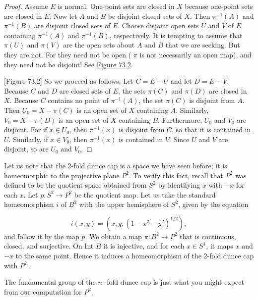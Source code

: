 \begin{proof}
Assume \(E\) is normal. One-point sets are closed in \(X\) because one-point sets are closed in \(E\). Now let \(A\) and \(B\) be disjoint closed sets of \(X\). Then \({\pi }^{-1}( A)\) and \({\pi }^{-1}( B)\) are disjoint closed sets of \(E\). Choose disjoint open sets \(U\) and \(V\) of \(E\) containing \({\pi }^{-1}( A)\) and \({\pi }^{-1}( B)\), respectively. It is tempting to assume that \(\pi ( U)\) and \(\pi ( V)\) are the open sets about \(A\) and \(B\) that we are seeking. But they are not. For they need not be open ( \(\pi\) is not necessarily an open map), and they need not be disjoint! See \hyperref[fig:73.2]{Figure 73.2}.

[Figure 73.2]
So we proceed as follows: Let \(C = E - U\) and let \(D = E - V\). Because \(C\) and \(D\) are closed sets of \(E\), the sets \(\pi ( C)\) and \(\pi ( D)\) are closed in \(X\). Because \(C\) contains no point of \({\pi }^{-1}( A)\), the set \(\pi ( C)\) is disjoint from \(A\). Then \(U_{0} = X - \pi ( C)\) is an open set of \(X\) containing \(A\). Similarly, \(V_{0} = X - \pi ( D)\) is an open set of \(X\) containing \(B\). Furthermore, \(U_{0}\) and \(V_{0}\) are disjoint. For if \(x \in {U}_{0}\), then \({\pi }^{-1}(x)\) is disjoint from \(C\), so that it is contained in \(U\). Similarly, if \(x \in {V}_{0}\), then \({\pi }^{-1}(x)\) is contained in \(V\). Since \(U\) and \(V\) are disjoint, so are \(U_{0}\) and \(V_{0}\).
\end{proof}

Let us note that the 2-fold dunce cap is a space we have seen before; it is homeomorphic to the projective plane \(P^{2}\). To verify this fact, recall that \(P^{2}\) was defined to be the quotient space obtained from \(S^{2}\) by identifying \(x\) with \(- x\) for each \(x\). Let \(p : S^{2} \rightarrow {P}^{2}\) be the quotient map. Let us take the standard homeomorphism \(i\) of \(B^{2}\) with the upper hemisphere of \(S^{2}\), given by the equation

\[
i( {x,y}) = ( {x,y,{( 1 - x^{2} - y^{2}) }^{1/2}}),
\]
and follow it by the map \(p\). We obtain a map \(\pi : B^{2} \rightarrow {P}^{2}\) that is continuous, closed, and surjective. On Int \(B\) it is injective, and for each \(x \in {S}^{1}\), it maps \(x\) and \(- x\) to the same point. Hence it induces a homeomorphism of the 2-fold dunce cap with \(P^{2}\).

The fundamental group of the \(n\) -fold dunce cap is just what you might expect from our computation for \(P^{2}\).

